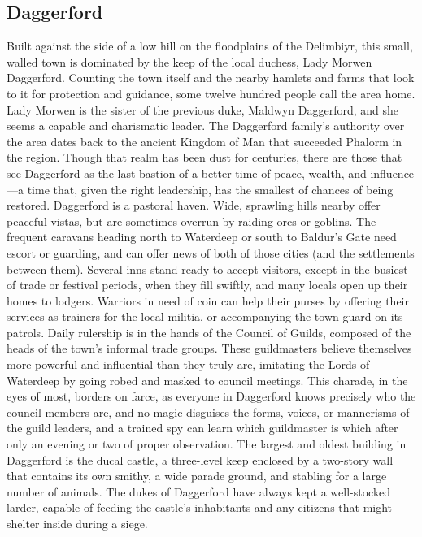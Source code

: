 \documentclass[10pt,a4paper,twoside,twocolumn,openany,bg=print,nodeprecatedcode]{dndbook}
\begin{document}
\subsection{Daggerford}
Built against the side of a low hill on the floodplains of the Delimbiyr, this small, walled town is dominated by the keep of the local duchess, Lady Morwen Daggerford. Counting the town itself and the nearby hamlets and farms that look to it for protection and guidance, some twelve hundred people call the area home. Lady Morwen is the sister of the previous duke, Maldwyn Daggerford, and she seems a capable and charismatic leader. The Daggerford family's authority over the area dates back to the ancient Kingdom of Man that succeeded Phalorm in the region. Though that realm has been dust for centuries, there are those that see Daggerford as the last bastion of a better time of peace, wealth, and influence—a time that, given the right leadership, has the smallest of chances of being restored.
Daggerford is a pastoral haven. Wide, sprawling hills nearby offer peaceful vistas, but are sometimes overrun by raiding orcs or goblins. The frequent caravans heading north to Waterdeep or south to Baldur's Gate need escort or guarding, and can offer news of both of those cities (and the settlements between them). Several inns stand ready to accept visitors, except in the busiest of trade or festival periods, when they fill swiftly, and many locals open up their homes to lodgers. Warriors in need of coin can help their purses by offering their services as trainers for the local militia, or accompanying the town guard on its patrols.
Daily rulership is in the hands of the Council of Guilds, composed of the heads of the town's informal trade groups. These guildmasters believe themselves more powerful and influential than they truly are, imitating the Lords of Waterdeep by going robed and masked to council meetings. This charade, in the eyes of most, borders on farce, as everyone in Daggerford knows precisely who the council members are, and no magic disguises the forms, voices, or mannerisms of the guild leaders, and a trained spy can learn which guildmaster is which after only an evening or two of proper observation.
The largest and oldest building in Daggerford is the ducal castle, a three-level keep enclosed by a two-story wall that contains its own smithy, a wide parade ground, and stabling for a large number of animals. The dukes of Daggerford have always kept a well-stocked larder, capable of feeding the castle's inhabitants and any citizens that might shelter inside during a siege.
\end{document}
